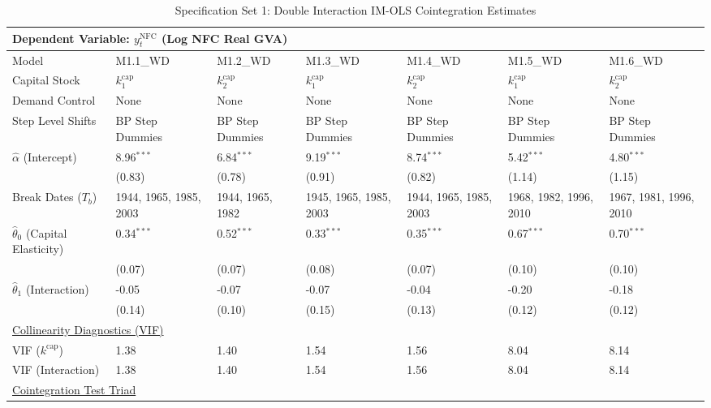 \begin{table}[H]
\centering
\caption{Specification Set 1: Double Interaction IM-OLS Cointegration Estimates}
\label{tab:paper_spec_set_1}
\scriptsize
\begin{tabular}{p{3.8cm}p{1.35cm}p{1.35cm}p{1.35cm}p{1.35cm}p{1.35cm}p{1.35cm}}
\toprule
\multicolumn{7}{l}{\textbf{Dependent Variable: $y_t^{\text{NFC}}$ (Log NFC Real GVA)}} \\
\midrule
Model & M1.1\_WD & M1.2\_WD & M1.3\_WD & M1.4\_WD & M1.5\_WD & M1.6\_WD  \\
Capital Stock & $k^{\text{cap}}_1$ & $k^{\text{cap}}_2$ & $k^{\text{cap}}_1$ & $k^{\text{cap}}_2$ & $k^{\text{cap}}_1$ & $k^{\text{cap}}_2$  \\
Demand Control & None & None & None & None & None & None  \\
Step Level Shifts & BP Step Dummies & BP Step Dummies & BP Step Dummies & BP Step Dummies & BP Step Dummies & BP Step Dummies  \\
\midrule
$\hat{\alpha}$ (Intercept)  & 8.96$^{***}$ & 6.84$^{***}$ & 9.19$^{***}$ & 8.74$^{***}$ & 5.42$^{***}$ & 4.80$^{***}$  \\
 & {\scriptsize (0.83)} & {\scriptsize (0.78)} & {\scriptsize (0.91)} & {\scriptsize (0.82)} & {\scriptsize (1.14)} & {\scriptsize (1.15)}  \\
Break Dates ($T_b$) & 1944, 1965, 1985, 2003 & 1944, 1965, 1982 & 1945, 1965, 1985, 2003 & 1944, 1965, 1985, 2003 & 1968, 1982, 1996, 2010 & 1967, 1981, 1996, 2010  \\
[1ex]
$\hat{\theta}_0$ (Capital Elasticity)  & 0.34$^{***}$ & 0.52$^{***}$ & 0.33$^{***}$ & 0.35$^{***}$ & 0.67$^{***}$ & 0.70$^{***}$  \\
 & {\scriptsize (0.07)} & {\scriptsize (0.07)} & {\scriptsize (0.08)} & {\scriptsize (0.07)} & {\scriptsize (0.10)} & {\scriptsize (0.10)}  \\
$\hat{\theta}_1$ (Interaction)  & -0.05 & -0.07 & -0.07 & -0.04 & -0.20 & -0.18  \\
 & {\scriptsize (0.14)} & {\scriptsize (0.10)} & {\scriptsize (0.15)} & {\scriptsize (0.13)} & {\scriptsize (0.12)} & {\scriptsize (0.12)}  \\
\midrule
\multicolumn{7}{l}{\underline{Collinearity Diagnostics (VIF)}} \\
VIF ($k^{\text{cap}}$) & 1.38 & 1.40 & 1.54 & 1.56 & 8.04 & 8.14  \\
VIF (Interaction) & 1.38 & 1.40 & 1.54 & 1.56 & 8.04 & 8.14  \\
\midrule
\multicolumn{7}{l}{\underline{Cointegration Test Triad}} \\

\end{tabular}
\end{table}
